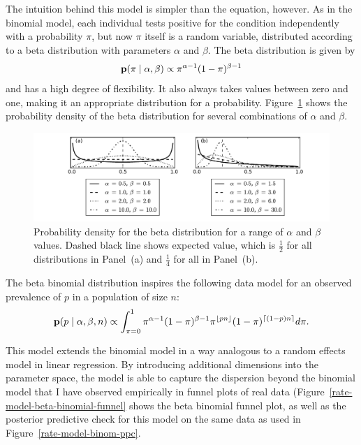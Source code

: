 The intuition behind this model is simpler than the equation,
however. As in the binomial model, each individual tests positive for
the condition independently with a probability $\pi$, but now $\pi$
itself is a random variable, distributed according to a beta
distribution with parameters $\alpha$ and $\beta$. The beta
distribution is given by 
\[
\mathbf{p}(\pi\;|\; \alpha, \beta)
\propto \pi^{\alpha-1}(1-\pi)^{\beta-1}
\]
and has a high degree of flexibility.  It also always takes values
between zero and one, making it an appropriate distribution for a
probability.  Figure~\ref{rate-model-beta} shows the probability
density of the beta distribution for several combinations of $\alpha$
and $\beta$.
\begin{figure}[ht]
\begin{center}
\includegraphics[width=\textwidth]{beta-distribution.pdf}
\end{center}
\caption{Probability density for the beta distribution for a range of
  $\alpha$ and $\beta$ values. Dashed black line shows expected value,
  which is $\frac{1}{2}$ for all distributions in Panel~(a) and
  $\frac{1}{4}$ for all in Panel~(b).}
\label{rate-model-beta}
\end{figure}

The beta binomial distribution inspires the following data model for
an observed prevalence of $p$ in a population of size $n$:
\[
\mathbf{p}(p\;|\; \alpha, \beta, n) \propto 
\int_{\pi=0}^1 \pi^{\alpha-1}(1-\pi)^{\beta-1}
\pi^{\lfloor pn\rfloor} (1-\pi)^{\lceil (1-p)n\rceil} d\pi.
\]

This model extends the binomial model in a way analogous to a random
effects model in linear regression.  By introducing additional
dimensions into the parameter space, the model is able to capture the
dispersion beyond the binomial model that I have observed empirically
in funnel plots of real data
(Figure~\ref{rate-model-beta-binomial-funnel} shows the beta
binomial funnel plot, as well as the posterior predictive check for
this model on the same data as used in
Figure~\ref{rate-model-binom-ppc}.

